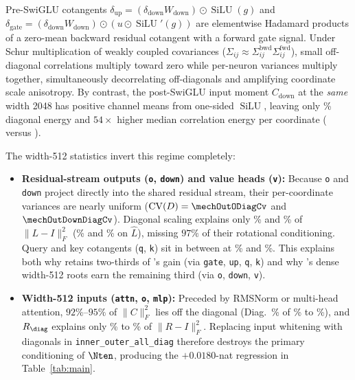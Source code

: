 \begin{finding}
Pre-SwiGLU cotangents $\delta_{\text{up}} = (\delta_{\text{down}}W_{\text{down}})
\odot \operatorname{SiLU}(g)$ and $\delta_{\text{gate}} = (\delta_{\text{down}}
W_{\text{down}}) \odot (u \odot \operatorname{SiLU}'(g))$ are elementwise
Hadamard products of a zero-mean backward residual cotangent with a forward
gate signal. Under Schur multiplication of weakly coupled covariances
($\Sigma_{ij} \approx \Sigma^{\text{bwd}}_{ij}\Sigma^{\text{fwd}}_{ij}$), small
off-diagonal correlations multiply toward zero while per-neuron variances
multiply together, simultaneously decorrelating off-diagonals and amplifying
coordinate scale anisotropy. By contrast, the post-SwiGLU input moment
$C_{\text{down}}$ at the \emph{same} width 2048 has positive channel means from
one-sided $\operatorname{SiLU}$, leaving only \mechInDownDiagEnergyPct\%
diagonal energy and $54\times$ higher median correlation energy per coordinate
(\mechInDownCorrEnergyMed{} versus \mechOutGateCorrEnergyMed{}).
\end{finding}

The width-512 statistics invert this regime completely:
\begin{itemize}
\item \textbf{Residual-stream outputs (\texttt{o}, \texttt{down}) and value
  heads (\texttt{v}):} Because \texttt{o} and \texttt{down} project directly
  into the shared residual stream, their per-coordinate variances are nearly
  uniform ($\mathrm{CV}(D) = \mechOutODiagCv$ and $\mechOutDownDiagCv$).
  Diagonal scaling explains only \mechOutOExpVarLPct\% and
  \mechOutDownExpVarLPct\% of $\|L - I\|_F^2$ (\mechOutOExpVarLhatPct\% and
  \mechOutDownExpVarLhatPct\% on $\hat L$), missing $97\%$ of their rotational
  conditioning. Query and key cotangents (\texttt{q}, \texttt{k}) sit in
  between at \mechOutQExpVarLPct\% and \mechOutKExpVarLPct\%. This explains
  both why \alldiag{} retains two-thirds of \mlpdiag{}'s gain (via
  \texttt{gate}, \texttt{up}, \texttt{q}, \texttt{k}) and why \mlpdiag{}'s
  dense width-512 roots earn the remaining third (via \texttt{o},
  \texttt{down}, \texttt{v}).
\item \textbf{Width-512 inputs (\texttt{attn}, \texttt{o}, \texttt{mlp}):}
  Preceded by RMSNorm or multi-head attention, $92\%$--$95\%$ of $\|C\|_F^2$
  lies off the diagonal (Diag.\ \% of \mechInMlpDiagEnergyPct\% to
  \mechInODiagEnergyPct\%), and $R_{\diag}$ explains only
  \mechInMlpExpVarLPct\% to \mechInOExpVarLPct\% of $\|R - I\|_F^2$. Replacing
  input whitening with diagonals in \texttt{inner\_outer\_all\_diag} therefore
  destroys the primary conditioning of $\Nten$, producing the $+0.0180$-nat
  regression in Table~\ref{tab:main}.
\end{itemize}


